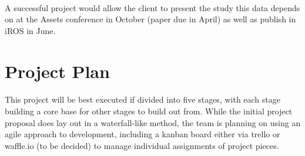 \documentclass[letterpaper,10pt,titlepage]{article}
\begin{document}
\paragraph{} A successful project would allow the client to present the study this data depends on at the Assets conference in October (paper due in April) as well as publish in iROS in June.

\section{Project Plan}
\paragraph{} This project will be best executed if divided into five stages, with each stage building a core base for other stages to build out from. While the initial project proposal does lay out in a waterfall-like method, the team is planning on using an agile approach to development, including a kanban board either via trello or waffle.io (to be decided) to manage individual assignments of project pieces.\\
\end{document}
